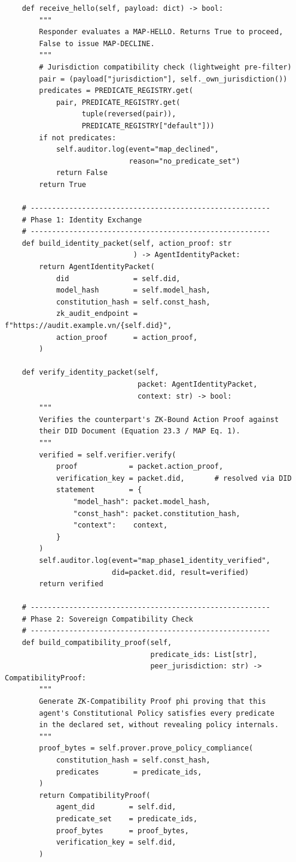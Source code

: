 \begin{lstlisting}
    def receive_hello(self, payload: dict) -> bool:
        """
        Responder evaluates a MAP-HELLO. Returns True to proceed,
        False to issue MAP-DECLINE.
        """
        # Jurisdiction compatibility check (lightweight pre-filter)
        pair = (payload["jurisdiction"], self._own_jurisdiction())
        predicates = PREDICATE_REGISTRY.get(
            pair, PREDICATE_REGISTRY.get(
                  tuple(reversed(pair)),
                  PREDICATE_REGISTRY["default"]))
        if not predicates:
            self.auditor.log(event="map_declined",
                             reason="no_predicate_set")
            return False
        return True

    # --------------------------------------------------------
    # Phase 1: Identity Exchange
    # --------------------------------------------------------
    def build_identity_packet(self, action_proof: str
                              ) -> AgentIdentityPacket:
        return AgentIdentityPacket(
            did               = self.did,
            model_hash        = self.model_hash,
            constitution_hash = self.const_hash,
            zk_audit_endpoint = f"https://audit.example.vn/{self.did}",
            action_proof      = action_proof,
        )

    def verify_identity_packet(self,
                               packet: AgentIdentityPacket,
                               context: str) -> bool:
        """
        Verifies the counterpart's ZK-Bound Action Proof against
        their DID Document (Equation 23.3 / MAP Eq. 1).
        """
        verified = self.verifier.verify(
            proof            = packet.action_proof,
            verification_key = packet.did,       # resolved via DID
            statement        = {
                "model_hash": packet.model_hash,
                "const_hash": packet.constitution_hash,
                "context":    context,
            }
        )
        self.auditor.log(event="map_phase1_identity_verified",
                         did=packet.did, result=verified)
        return verified

    # --------------------------------------------------------
    # Phase 2: Sovereign Compatibility Check
    # --------------------------------------------------------
    def build_compatibility_proof(self,
                                  predicate_ids: List[str],
                                  peer_jurisdiction: str) -> CompatibilityProof:
        """
        Generate ZK-Compatibility Proof phi proving that this
        agent's Constitutional Policy satisfies every predicate
        in the declared set, without revealing policy internals.
        """
        proof_bytes = self.prover.prove_policy_compliance(
            constitution_hash = self.const_hash,
            predicates        = predicate_ids,
        )
        return CompatibilityProof(
            agent_did        = self.did,
            predicate_set    = predicate_ids,
            proof_bytes      = proof_bytes,
            verification_key = self.did,
        )


\end{lstlisting}
